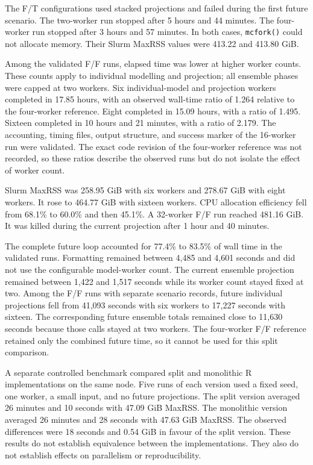The F/T configurations used stacked projections and failed during the first future scenario. The two-worker run stopped after 5 hours and 44 minutes. The four-worker run stopped after 3 hours and 57 minutes. In both cases, \texttt{mcfork()} could not allocate memory. Their Slurm MaxRSS values were 413.22 and 413.80 GiB.

Among the validated F/F runs, elapsed time was lower at higher worker counts. These counts apply to individual modelling and projection; all ensemble phases were capped at two workers. Six individual-model and projection workers completed in 17.85 hours, with an observed wall-time ratio of 1.264 relative to the four-worker reference. Eight completed in 15.09 hours, with a ratio of 1.495. Sixteen completed in 10 hours and 21 minutes, with a ratio of 2.179. The accounting, timing files, output structure, and success marker of the 16-worker run were validated. The exact code revision of the four-worker reference was not recorded, so these ratios describe the observed runs but do not isolate the effect of worker count.

Slurm MaxRSS was 258.95 GiB with six workers and 278.67 GiB with eight workers. It rose to 464.77 GiB with sixteen workers. CPU allocation efficiency fell from 68.1\% to 60.0\% and then 45.1\%. A 32-worker F/F run reached 481.16 GiB. It was killed during the current projection after 1 hour and 40 minutes.

The complete future loop accounted for 77.4\% to 83.5\% of wall time in the validated runs. Formatting remained between 4,485 and 4,601 seconds and did not use the configurable model-worker count. The current ensemble projection remained between 1,422 and 1,517 seconds while its worker count stayed fixed at two. Among the F/F runs with separate scenario records, future individual projections fell from 41,093 seconds with six workers to 17,227 seconds with sixteen. The corresponding future ensemble totals remained close to 11,630 seconds because those calls stayed at two workers. The four-worker F/F reference retained only the combined future time, so it cannot be used for this split comparison.

A separate controlled benchmark compared split and monolithic R implementations on the same node. Five runs of each version used a fixed seed, one worker, a small input, and no future projections. The split version averaged 26 minutes and 10 seconds with 47.09 GiB MaxRSS. The monolithic version averaged 26 minutes and 28 seconds with 47.63 GiB MaxRSS. The observed differences were 18 seconds and 0.54 GiB in favour of the split version. These results do not establish equivalence between the implementations. They also do not establish effects on parallelism or reproducibility.

